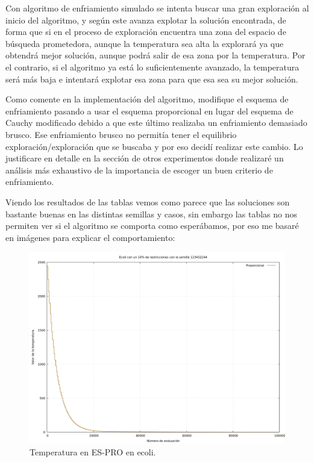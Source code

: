 \documentclass[12pt, spanish]{article}
\begin{document}
Con  algoritmo de enfriamiento simulado se intenta buscar una gran exploración al inicio del algoritmo, y según este avanza explotar la solución encontrada, de forma que si en el proceso de exploración encuentra una zona del espacio de búsqueda prometedora, aunque la temperatura sea alta la explorará ya que obtendrá mejor solución, aunque podrá salir de esa zona por la temperatura. Por el contrario, si el algoritmo ya está lo suficientemente avanzado, la temperatura será más baja e intentará explotar esa zona para que esa sea su mejor solución.

Como comente en la implementación del algoritmo, modifique el esquema de enfriamiento pasando a usar el esquema proporcional en lugar del esquema de Cauchy modificado debido a que este último realizaba un enfriamiento demasiado brusco. Ese enfriamiento brusco no permitía tener el equilibrio exploración/exploración que se buscaba y por eso decidí realizar este cambio. Lo justificare en detalle en la sección de otros experimentos donde realizaré un análisis más exhaustivo de la importancia de escoger un buen criterio de enfriamiento.

Viendo los resultados de las tablas vemos como parece que las soluciones son bastante buenas en las distintas semillas y casos, sin embargo las tablas no nos permiten ver si el algoritmo se comporta como esperábamos, por eso me basaré en imágenes para explicar el comportamiento:

\begin{figure}[H]
	\centering
	\includegraphics[scale = 0.35]{es-temp-ecoli-10.png}
	
	\caption{Temperatura en ES-PRO en ecoli.}
	\label{fig:es-cmp2}
\end{figure}
\end{document}
